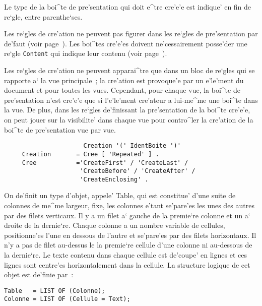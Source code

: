 {Le type de la boi^te de pre'sentation qui doit e^tre cre'e'e est indique'
en fin de re`gle, entre parenthe`ses.

Les re`gles de cre'ation ne peuvent pas figurer dans les re`gles de
pre'sentation par de'faut (voir page~\pageref{reglesdefaut}). Les boi^tes
cre'e'es doivent ne'cessairement posse'der une re`gle {\tt Content} qui
indique leur contenu (voir page~\pageref{content}).

Les re`gles de cre'ation ne peuvent apparai^tre que dans un bloc de re`gles qui
se rapporte a` la vue principale~; la cre'ation est provoque'e par un e'le'ment du
document et pour toutes les vues. Cependant, pour chaque vue, la boi^te
de pre'sentation n'est cre'e'e que si l'e'le'ment cre'ateur a lui-me^me une
boi^te dans la vue. De plus, dans les re`gles de'finissant la pre'sentation
de la boi^te cre'e'e, on peut jouer sur la visibilite' dans chaque vue pour
contro^ler la cre'ation de la boi^te de pre'sentation vue par vue.

\begin{verbatim}
                      Creation '(' IdentBoite ')'
     Creation       = Cree [ 'Repeated' ] .
     Cree           ='CreateFirst' / 'CreateLast' /
                     'CreateBefore' / 'CreateAfter' /
                     'CreateEnclosing' .
\end{verbatim}

\begin{example}
On de'finit un type d'objet, appele' Table, qui est constitue' d'une suite de
colonnes de me^me largeur, fixe, les colonnes e'tant se'pare'es les unes des
autres par des filets verticaux. Il y a un filet a` gauche de la premie`re
colonne et un a` droite de la dernie`re. Chaque colonne a un nombre variable
de cellules, positionne'es l'une en dessous de l'autre et se'pare'es par des
filets horizontaux. Il n'y a pas de filet au-dessus le la premie`re cellule
d'une colonne ni au-dessous de la dernie`re. Le texte contenu dans chaque
cellule est de'coupe' en lignes et ces lignes sont centre'es horizontalement
dans la cellule. La structure logique de cet objet est de'finie par~:

\begin{verbatim}
Table   = LIST OF (Colonne);
Colonne = LIST OF (Cellule = Text);
\end{verbatim}


\end{example}}
